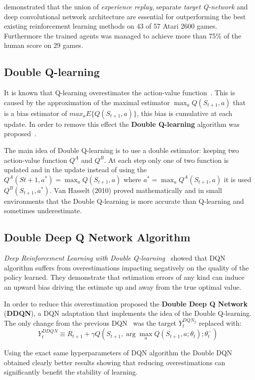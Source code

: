 \citeauthor{Mnih2015}  demonstrated that the union of \textit{experience replay}, separate \textit{target Q-network} and deep convolutional network architecture are essential for outperforming the best existing reinforcement learning methods on 43 of 57 Atari 2600 games. Furthermore the trained agents was managed to achieve more than 75\% of the human score on 29 games.



\subsection{Double Q-learning}
\label{subsec:DoubleQlearning}

It is known that Q-learning overestimates the action-value function~\cite{NIPS2010_3964}. This is caused by the approximation of the maximal estimator $\max_a Q(S_{t+1}, a)$ that is a bias estimator of $max_a E \{ Q(S_{t+1}, a) \}$, this bias is cumulative at each update. In order to remove this effect the \textbf{Double Q-learning} algorithm was proposed~\cite{NIPS2010_3964}.

The main idea of Double Q-learning is to use a double estimator: keeping two action-value function $Q^A$ and $Q^B$. At each step only one of two function is updated and in the update instead of using the $Q^A(S{t+1}, a^*) = \max_a Q(S_{t+1}, a)$ where $a^* = \max_a Q^A(S_{t+1}, a)$ it is used $Q^B(S_{t+1}, a^*)$.
Van Hasselt (2010) proved mathematically and in small environments that the Double Q-learning is more accurate than Q-learning and sometimes underestimate.
\
\subsection{Double Deep Q Network Algorithm}

\textit{Deep Reinforcement Learning with Double Q-learning}~\cite{Hasselt:2016:DRL:3016100.3016191} showed that DQN algorithm suffers from overestimations impacting negatively on the quality of the policy learned. They demonstrate that estimation errors of any kind can induce an upward bias driving the estimate up and away from the true optimal value.

In order to reduce this overestimation \citeauthor{Hasselt:2016:DRL:3016100.3016191}  proposed the \textbf{Double Deep Q Network} (\textbf{DDQN}), a DQN adaptation that implements the idea of the Double Q-learning. The only change from the previous DQN~\cite{Mnih2015} was the target $Y_t^{DQN_2}$ replaced with:
\begin{equation}
	Y^{DDQN}_t \equiv R_{t+1} + \gamma Q(S_{t+1}, 
		\arg\max_{a} Q(S_{t+1}, a; \theta_t); \theta_t^-)
\end{equation}

Using the exact same hyperparameters of DQN algorithm the Double DQN obtained clearly better results showing that reducing overestimations can significantly benefit the stability of learning.


